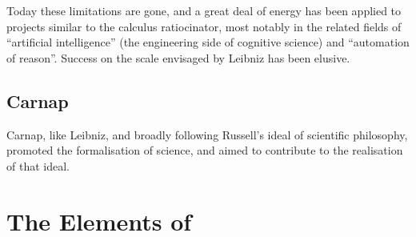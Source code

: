 \documentclass[numreferences]{rbjk}
\begin{document}
\begin{article}
Today these limitations are gone, and a great deal of energy has been applied to projects similar to the calculus ratiocinator, most notably in the related fields of ``artificial intelligence'' (the engineering side of cognitive science) and ``automation of reason''.
Success on the scale envisaged by Leibniz has been elusive.

\subsection{Carnap}

Carnap, like Leibniz, and broadly following Russell's ideal of scientific philosophy, promoted the formalisation of science, and aimed to contribute to the realisation of that ideal.



\section{The Elements of }



%
%


\end{article}
\end{document}
